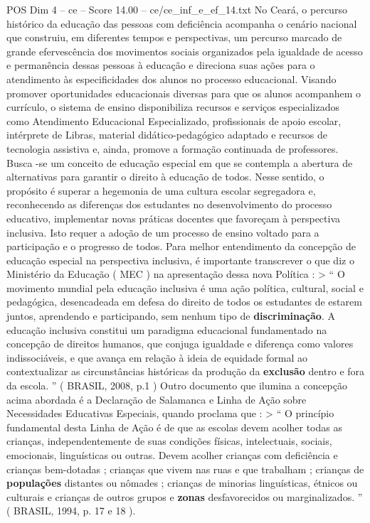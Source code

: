 \begin{textsample}{POS Dim 4 – ce – Score 14.00 – ce/ce\_inf\_e\_ef\_14.txt}
No Ceará, o percurso histórico da educação das pessoas com deficiência acompanha o cenário nacional que construiu, em diferentes tempos e perspectivas, um percurso marcado de grande efervescência dos movimentos sociais organizados pela igualdade de acesso e permanência dessas pessoas à educação e direciona suas ações para o atendimento às especificidades dos alunos no processo educacional.
Visando promover oportunidades educacionais diversas para que os alunos acompanhem o currículo, o sistema de ensino disponibiliza recursos e serviços especializados como Atendimento Educacional Especializado, profissionais de apoio escolar, intérprete de Libras, material didático-pedagógico adaptado e recursos de tecnologia assistiva e, ainda, promove a formação continuada de professores.
Busca -se um conceito de educação especial em que se contempla a abertura de alternativas para garantir o direito à educação de todos.
Nesse sentido, o propósito é superar a hegemonia de uma cultura escolar segregadora e, reconhecendo as diferenças dos estudantes no desenvolvimento do processo educativo, implementar novas práticas docentes que favoreçam à perspectiva inclusiva.
Isto requer a adoção de um processo de ensino voltado para a participação e o progresso de todos.
Para melhor entendimento da concepção de educação especial na perspectiva inclusiva, é importante transcrever o que diz o Ministério da Educação ( MEC ) na apresentação dessa nova Política : > “ O movimento mundial pela educação inclusiva é uma ação política, cultural, social e pedagógica, desencadeada em defesa do direito de todos os estudantes de estarem juntos, aprendendo e participando, sem nenhum tipo de \textbf{discriminação}.
A educação inclusiva constitui um paradigma educacional fundamentado na concepção de direitos humanos, que conjuga igualdade e diferença como valores indissociáveis, e que avança em relação à ideia de equidade formal ao contextualizar as circunstâncias históricas da produção da \textbf{exclusão} dentro e fora da escola. ” ( BRASIL, 2008, p.1 ) Outro documento que ilumina a concepção acima abordada é a Declaração de Salamanca e Linha de Ação sobre Necessidades Educativas Especiais, quando proclama que : > “ O princípio fundamental desta Linha de Ação é de que as escolas devem acolher todas as crianças, independentemente de suas condições físicas, intelectuais, sociais, emocionais, linguísticas ou outras.
Devem acolher crianças com deficiência e crianças bem-dotadas ; crianças que vivem nas ruas e que trabalham ; crianças de \textbf{populações} distantes ou nômades ; crianças de minorias linguísticas, étnicos ou culturais e crianças de outros grupos e \textbf{zonas} desfavorecidos ou marginalizados. ” ( BRASIL, 1994, p. 17 e 18 ).

\end{textsample}
